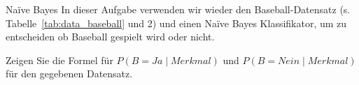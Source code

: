 \begin{task}[credit=19]{Na\"ive Bayes}
In dieser Aufgabe verwenden wir wieder den Baseball-Datensatz (s. Tabelle~\ref{tab:data_baseball} und 2) und einen Na\"ive Bayes Klassifikator, um zu entscheiden ob Baseball gespielt wird oder nicht.
\begin{comment}
\begin{table}[h!]
\centering
\begin{tabular}{|l|l|l|l|l|l|}
\hline
Day & Outlook  & Temperature & Humidity & Wind   & Play ball \\ \hline
D1  & Sunny    & Hot         & High     & Weak   & No        \\ \hline
D2  & Sunny    & Hot         & High     & Strong & No        \\ \hline
D3  & Overcast & Hot         & High     & Weak   & Yes       \\ \hline
D4  & Rain     & Mild        & High     & Weak   & Yes       \\ \hline
D5  & Rain     & Cool        & Normal   & Weak   & Yes       \\ \hline
D6  & Rain     & Cool        & Normal   & Strong & No        \\ \hline
D7  & Overcast & Cool        & Normal   & Strong & Yes       \\ \hline
D8  & Sunny    & Mild        & High     & Weak   & No        \\ \hline
D9  & Sunny    & Cool        & Normal   & Weak   & Yes       \\ \hline
D10 & Rain     & Mild        & Normal   & Weak   & Yes       \\ \hline
D11 & Sunny    & Mild        & Normal   & Strong & Yes       \\ \hline
D12 & Overcast & Mild        & High     & Strong & Yes       \\ \hline
D13 & Overcast & Hot         & Normal   & Weak   & Yes       \\ \hline
D14 & Rain     & Mild        & High     & Strong & No        \\ \hline
\end{tabular}
\caption{Training data}
\end{table}
\end{comment}


\begin{subtask}[title={Formel für Merkmalsausprägung},points=4]
Zeigen Sie die Formel für $P(B=Ja \mid Merkmal)$ und  $P(B=Nein \mid Merkmal) $ für den gegebenen Datensatz.


\end{subtask}
\end{task}

